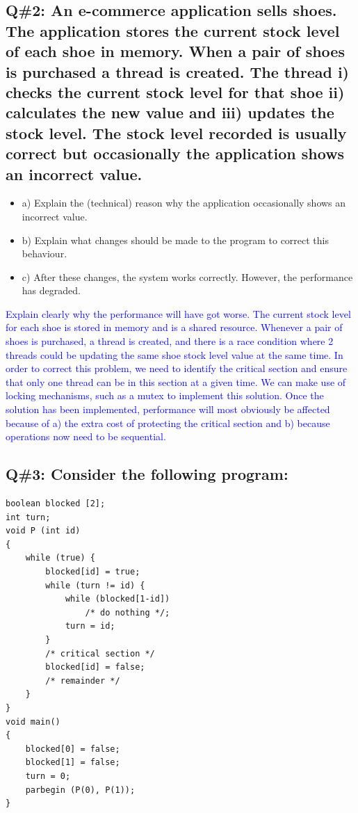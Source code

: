 \subsection*{Q\#2: An e-commerce application sells shoes. The application stores the current stock level of each
shoe in memory. When a pair of shoes is purchased a thread is created. The thread i) checks the current
stock level for that shoe ii) calculates the new value and iii) updates the stock level. The stock level
recorded is usually correct but occasionally the application shows an incorrect value.}
\begin{itemize}
    \item{a)} Explain the (technical) reason why the application occasionally shows an incorrect value.
    \item{b)} Explain what changes should be made to the program to correct this behaviour.
    \item{c)} After these changes, the system works correctly. However, the performance has degraded.
\end{itemize}
\textcolor{blue}{
Explain clearly why the performance will have got worse.
The current stock level for each shoe is stored in memory and is a shared resource. Whenever a pair of
shoes is purchased, a thread is created, and there is a race condition where 2 threads could be updating
the same shoe stock level value at the same time. 
\newline
In order to correct this problem, we need to identify the critical section and ensure that only one thread
can be in this section at a given time. We can make use of locking mechanisms, such as a mutex to
implement this solution. 
\newline
Once the solution has been implemented, performance will most obviously be affected because of a)
the extra cost of protecting the critical section and b) because operations now need to be sequential.
}
\subsection*{Q\#3: Consider the following program:}


\begin{lstlisting}
boolean blocked [2];
int turn;
void P (int id)
{
    while (true) {
        blocked[id] = true;
        while (turn != id) {
            while (blocked[1-id])
                /* do nothing */;
            turn = id;
        }
        /* critical section */
        blocked[id] = false;
        /* remainder */
    }
}
void main()
{
    blocked[0] = false;
    blocked[1] = false;
    turn = 0;
    parbegin (P(0), P(1));
}
\end{lstlisting}

